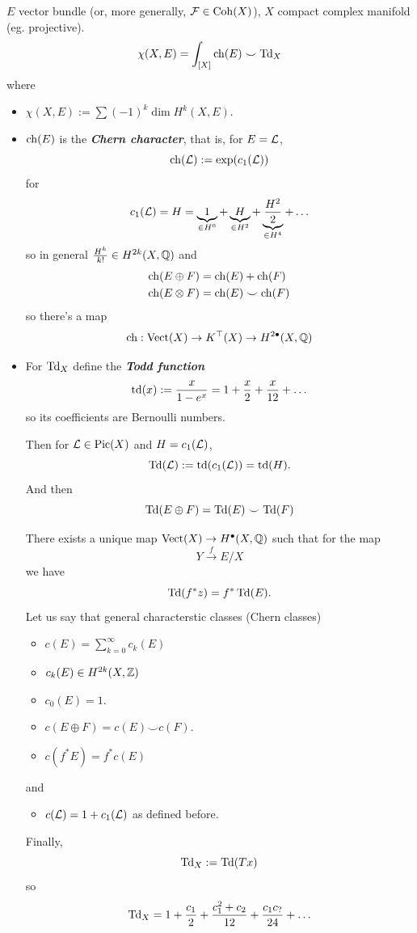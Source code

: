 \begin{thm}
	$E$ vector bundle (or, more generally, $\mathcal{F}\in\operatorname{Coh}(X)$), $X$ compact complex manifold (eg. projective).
	\[\chi(X,E)=\int_{[X]}\operatorname{ch}(E)\smile \operatorname{Td}_X\]
	where
	\begin{itemize}
		\item $\chi(X,E):=\sum(-1)^k\dim H^k(X,E)$.
		\item $\operatorname{ch}(E)$ is the \textbf{\textit{Chern character}}, that is, for $E=\mathcal{L}$,
		\[\operatorname{ch}(\mathcal{L}):=\exp(c_1(\mathcal{L}))\]
		for
		\[c_1(\mathcal{L})=H=\underbrace{1}_{\in H^0}+\underbrace{H}_{\in H^2}+\underbrace{\frac{H^2}{2}}_{\in H^4}+\ldots\]
		so in general $\frac{H^k}{k!}\in H^{2k}(X,\mathbb{Q})$ and
		\begin{align*}
			\operatorname{ch}(E\oplus F)&=\operatorname{ch}(E)+\operatorname{ch}(F)\\
			\operatorname{ch}(E\otimes F)&=\operatorname{ch}(E)\smile\operatorname{ch}(F)
		\end{align*}
		so there's a map
		\[\operatorname{ch}:\operatorname{Vect}(X)\to K^{\top}(X)\to H^{2\bullet}(X,\mathbb{Q})\]
		\item For $\operatorname{Td}_X$ define the \textbf{\textit{Todd function}}
		\[\operatorname{td}(x):=\frac{x}{1-e^x}=1+\frac{x}{2}+\frac{x}{12}+\ldots\]
		so its coefficients are Bernoulli numbers.
		
		Then for $\mathcal{L}\in\operatorname{Pic}(X)$ and $H=c_1(\mathcal{L})$,
		\[\operatorname{Td}(\mathcal{L}):=\operatorname{td}(c_1(\mathcal{L}))=\operatorname{td}(H).\]
		And then
		\[\operatorname{Td}(E\oplus F)=\operatorname{Td}(E)\smile\operatorname{Td}(F)\]
		\begin{claim}
			There exists a unique map $\operatorname{Vect}(X)\to H^{\bullet}(X,\mathbb{Q})$ such that for the map
			\[Y\overset{f}{\to}E/X\]
			we have
			\[\operatorname{Td}(f^*z)=f^*\operatorname{Td}(E).\]
			Let us say that general characterstic classes (Chern classes)
			\begin{itemize}[label=$\circ$]
				\item $c(E)=\sum_{k=0}^\infty c_k(E)$
				\item $c_k(E)\in H^{2k}(X,\mathbb{Z})$
				\item $c_0(E)=1$.
				\item $c(E\oplus F)=c(E)\smile c(F)$.
				\item $c(f^*E)=f^*c(E)$
			\end{itemize}
			and
			\begin{itemize}[label=$\circ$]
				\item $c(\mathcal{L})=1+c_1(\mathcal{L})$ as defined before.
			\end{itemize}
			Finally,
			\[\operatorname{Td}_X:=\operatorname{Td}(Tx)\]
			so
			\[\operatorname{Td}_X=1+\frac{c_1}{2}+\frac{c_1^2+c_2}{12}+\frac{c_1c_?}{24}+\ldots\]
		\end{claim}
	\end{itemize}
\end{thm}
